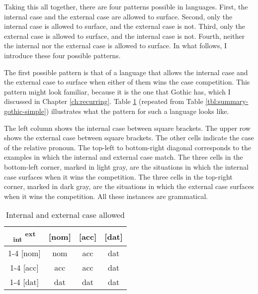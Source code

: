 Taking this all together, there are four patterns possible in languages. First, the internal case and the external case are allowed to surface. Second, only the internal case is allowed to surface, and the external case is not. Third, only the external case is allowed to surface, and the internal case is not. Fourth, neither the internal nor the external case is allowed to surface. In what follows, I introduce these four possible patterns.

The first possible pattern is that of a language that allows the internal case and the external case to surface when either of them wins the case competition. This pattern might look familiar, because it is the one that Gothic has, which I discussed in Chapter \ref{ch:recurring}. Table \ref{tbl:case-competition-int-ext} (repeated from Table \ref{tbl:summary-gothic-simple}) illustrates what the pattern for such a language looks like.

The left column shows the internal case between square brackets. The upper row shows the external case between square brackets. The other cells indicate the case of the relative pronoun.
The top-left to bottom-right diagonal corresponds to the examples in which the internal and external case match. The three cells in the bottom-left corner, marked in light gray, are the situations in which the internal case surfaces when it wins the competition. The three cells in the top-right corner, marked in dark gray, are the situations in which the external case surfaces when it wins the competition.
All these instances are grammatical.

\begin{table}[H]
  \center
  \caption{Internal and external case allowed}
  \begin{tabular}{c|c|c|c}
    \toprule
    \textsubscript{\ac{int}} \textsuperscript{\ac{ext}}
           & [\ac{nom}]
           & [\ac{acc}]
           & [\ac{dat}]
           \\ \cmidrule{1-4}
       [\ac{nom}]
           & \ac{nom}
           & \cellcolor{DG}\ac{acc}
           & \cellcolor{DG}\ac{dat}
           \\ \cmidrule{1-4}
       [\ac{acc}]
           & \cellcolor{LG}\ac{acc}
           & \ac{acc}
           & \cellcolor{DG}\ac{dat}
           \\ \cmidrule{1-4}
       [\ac{dat}]
           & \cellcolor{LG}\ac{dat}
           & \cellcolor{LG}\ac{dat}
           & \ac{dat}
           \\
     \bottomrule
  \end{tabular}
    \label{tbl:case-competition-int-ext}
\end{table}

